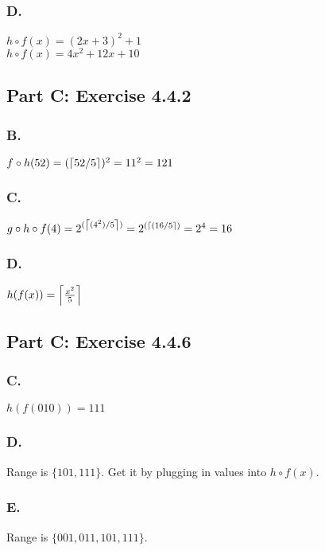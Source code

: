 \documentclass[titlepage]{article}\pagestyle{empty}
\DeclarePairedDelimiter\ceil{\lceil}{\rceil}
\begin{document}
\subsubsection*{D.} 
$h \circ f(x) = (2x + 3)^2 + 1$\\
$h \circ f(x) = 4x^2 + 12x + 10$
\subsection*{Part C: Exercise 4.4.2}
\subsubsection*{B.} 
$f \circ h(52) = (\ceil*{52/5})^2 =  11^2 = 121$
\subsubsection*{C.} 
$g \circ h \circ f(4) = 2^{(\ceil*{(4^2)/5})} = 2^{(\ceil*{(16/5})} = 2^4 = 16$
\subsubsection*{D.} 
$h(f(x))=\ceil*{\frac{x^2}{5}}$
\subsection*{Part C: Exercise 4.4.6}
\subsubsection*{C.} $h(f(010))=111$
\subsubsection*{D.} Range is $\{101, 111\}$. Get it by plugging in values into $h \circ f(x)$.
\subsubsection*{E.} Range is $\{001, 011, 101, 111\}$.
\end{document}
